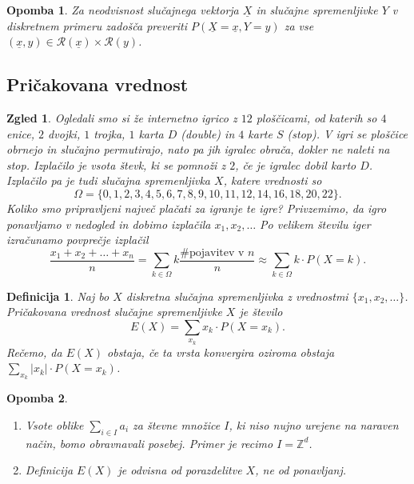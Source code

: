 \documentclass[10pt, a4paper]{article}
\newtheorem{defi}[izr]{Definicija}
\newenvironment{noticeB}{%
  \tcolorbox[%
  notitle,
  empty,
  enhanced,  %
  breakable,
  coltext=black,
  colback=white, 
  fontupper=\rmfamily,
  noparskip,
  sharp corners,
  boxrule=-1pt,  %
  frame hidden,
  left=7pt,  %
  right=7pt,
  top=5pt,
  bottom=5pt,
  before skip=2.5ex plus 2pt,
  after skip=2.5ex plus 2pt,
  borderline west = {1.5pt}{-0.1pt}{blue!30!black}, %
  overlay unbroken and last={%
    \draw[color=black, line width=1.25pt]
    ($(frame.south west)+(1.pt, -0.1pt)$) -- ++(2em, 0);
  }
  ]}
{\endtcolorbox}
\newenvironment{definicija}{\begin{noticeB}\begin{defi}}{%
    \end{defi}\end{noticeB}}
\newtheorem*{opomba}{Opomba}
\newtheorem{zgled}[izr]{Zgled}
\newcommand{\Z}{\mathbb {Z}}
\begin{document}
\begin{opomba}
  Za neodvisnost slučajnega vektorja $\underline{X}$ in slučajne spremenljivke $Y$
  v diskretnem primeru zadošča preveriti $P(\underline{X} = \underline{x}, Y = y)$
  za vse $(\underline{x}, y) \in \mathcal{R} (\underline{x}) \times \mathcal{R} (y)$.
\end{opomba}

\subsection{Pričakovana vrednost}

\begin{zgled}
  Ogledali smo si že internetno igrico z $12$ ploščicami, od katerih so $4$ enice,
  $2$ dvojki, $1$ trojka, $1$ karta $D$ (double) in $4$ karte $S$ (stop).
  V igri se ploščice obrnejo in slučajno permutirajo, nato pa jih igralec obrača, dokler ne naleti na stop.
  Izplačilo je vsota števk, ki se pomnoži z $2$, če je igralec dobil karto $D$.
  Izplačilo pa je tudi slučajna spremenljivka $X$, katere vrednosti so 
  $$\Omega = \{0, 1, 2, 3, 4, 5, 6,7, 8, 9, 10, 11, 12, 14, 16, 18, 20, 22\}.$$
  Koliko smo pripravljeni največ plačati za igranje te igre?
  Privzemimo, da igro ponavljamo v nedogled in dobimo izplačila $x_1, x_2, \dots$
  Po velikem številu iger izračunamo povprečje izplačil 
  $$\frac{x_1 + x_2 + \dots + x_n}{n} = \sum_{k \in \Omega} k \frac{\text{\# pojavitev v $n$}}{n} \approx \sum_{k \in \Omega} k \cdot P(X = k).$$
\end{zgled}

\begin{definicija}
  Naj bo $X$ diskretna slučajna spremenljivka z vrednostmi $\{x_1, x_2, \dots\}$.
  Pričakovana vrednost slučajne spremenljivke $X$ je število 
  $$E(X) = \sum_{x_k} x_k \cdot P(X = x_k).$$
  Rečemo, da $E(X)$ obstaja, če ta vrsta konvergira oziroma obstaja $\sum_{x_k} |x_k| \cdot P(X = x_k)$.
\end{definicija}

\begin{opomba}
  \begin{enumerate}
    \item Vsote oblike $\sum_{i \in I} a_i$ za števne množice $I$, ki niso nujno urejene 
    na naraven način, bomo obravnavali posebej. Primer je recimo $I = \Z^d$.
    \item Definicija $E(X)$ je odvisna od porazdelitve $X$, ne od ponavljanj.
  \end{enumerate}
\end{opomba}
\end{document}
